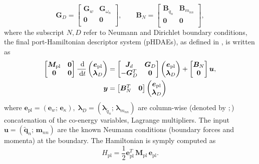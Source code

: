 \documentclass[letterpaper, 10 pt, conference]{ieeeconf}
\begin{document}
\[\bm{G}_D = \begin{bmatrix}
\bm{G}_{w} & \bm{G}_{\omega_n} \\
\bm{0} & \bm{0}  \\
\end{bmatrix}, \qquad 
\bm{B}_N = \begin{bmatrix}
\bm{B}_{\widetilde{q}_n} & \bm{B}_{m_{nn}} \\
\bm{0} & \bm{0}  \\
\end{bmatrix},
\]
 where the subscript $N, D$ refer to Neumann and Dirichlet boundary conditions, the final port-Hamiltonian descriptor system (pHDAEs), as defined in \cite{beattie2018linear}, is written as
\begin{equation}
\begin{aligned}
\label{eq:discr_pl}
\begin{bmatrix}
\bm{M}_{\text{pl}} & \bm{0} \\
\bm{0} & \bm{0} \\
\end{bmatrix} \frac{\d}{\d t}
\begin{pmatrix}
\bm{e}_{\text{pl}}\\
\bm{\lambda}_D \\
\end{pmatrix}
&= \begin{bmatrix}
\bm{J}_d & \bm{G}_D\\
-\bm{G}_D^T & \bm{0} \\
\end{bmatrix}
\begin{pmatrix}
\bm{e}_{\text{pl}}\\
\bm{\lambda}_D \\
\end{pmatrix} + \begin{bmatrix}
\bm{B}_N\\
\bm{0} \\
\end{bmatrix}
\bm{u}, \\
\bm{y} &= \begin{bmatrix}
\bm{B}_N^T & \bm{0} \\ \end{bmatrix}
\begin{pmatrix}
\bm{e}_{\text{pl}}\\
\bm{\lambda}_D \\
\end{pmatrix}
\end{aligned}
\end{equation}
where $\bm{e}_{\text{pl}} = (\bm{e}_w; \, \bm{e}_\kappa), \;  \bm{\lambda}_D = (\bm{\lambda}_{\widetilde{q}_n}; \, \bm{\lambda}_{m_{nn}})$ are column-wise (denoted by $;$) concatenation of the co-energy variables, Lagrange multipliers. The input $\bm{u} = (\widetilde{\bm{q}}_n; \, \bm{m}_{nn})$ are the known Neumann conditions (boundary forces and momenta) at the boundary. 
 The Hamiltonian is symply computed as
\begin{equation}
H_{\text{pl}} = \frac{1}{2} \bm{e}_{\text{pl}}^T \, \bm{M}_{\text{pl}} \, \bm{e}_{\text{pl}}.
\end{equation}
\end{document}

